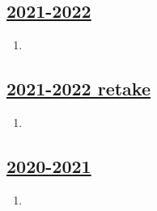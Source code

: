\subsection[2021-2022]{\hyperref[sec:kr_01_2021_2022]{2021-2022}}
\label{sec:sol_kr_01_2021_2022} %



\begin{enumerate}

\item 


\end{enumerate}
    

\subsection[2021-2022 retake]{\hyperref[sec:kr_01_2021_2022_retake]{2021-2022 retake}}
\label{sec:sol_kr_01_2021_2022_retake} %



\begin{enumerate}

\item 


\end{enumerate}



\subsection[2020-2021]{\hyperref[sec:kr_01_2020_2021]{2020-2021}}
\label{sec:sol_kr_01_2020_2021} %



\begin{enumerate}
    
    
    
    \item
 
 
\end{enumerate}



